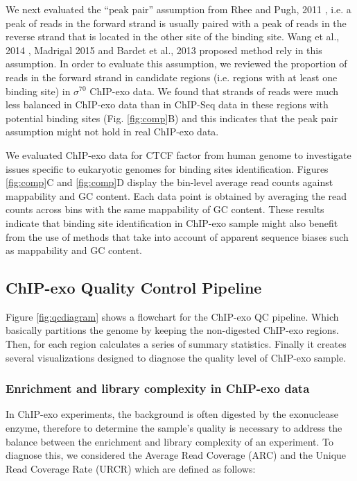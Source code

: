 \documentclass{bmcart}\usepackage[]{graphicx}\usepackage[]{color}
\newcommand{\sig}{\sigma^{70}}
\begin{document}
We next evaluated the ``peak pair'' assumption from Rhee and Pugh,
2011 \cite{exo1}, i.e. a peak of reads in the forward strand is
usually paired with a peak of reads in the reverse strand that is
located in the other site of the binding site. Wang et al., 2014
\cite{mace}, Madrigal 2015 \cite{cexor} and Bardet et al., 2013
\cite{peakzilla} proposed method rely in this assumption. In order to
evaluate this assumption, we reviewed the proportion of reads in the
forward strand in candidate regions (i.e. regions with at least one
binding site) in $\sig$ ChIP-exo data. We found that strands of reads
were much less balanced in ChIP-exo data than in ChIP-Seq data in
these regions with potential binding sites (Fig. \ref{fig:comp}B) and
this indicates that the peak pair assumption might not hold in real
ChIP-exo data.

We evaluated ChIP-exo data for CTCF factor from human genome
\cite{exo1} to investigate issues specific to eukaryotic genomes for
binding sites identification. Figures \ref{fig:comp}C and
\ref{fig:comp}D display the bin-level average read counts against
mappability and GC content. Each data point is obtained by averaging
the read counts across bins with the same mappability of GC
content. These results indicate that binding site identification in
ChIP-exo sample might also benefit from the use of methods that take
into account of apparent sequence biases such as mappability and GC
content.


\subsection{ChIP-exo Quality Control Pipeline}

Figure \ref{fig:qcdiagram} shows a flowchart for the ChIP-exo QC
pipeline. Which basically partitions the genome by keeping the
non-digested ChIP-exo regions. Then, for each region calculates a
series of summary statistics. Finally it creates several
visualizations designed to diagnose the quality level of ChIP-exo
sample.

\subsubsection{Enrichment and library complexity in ChIP-exo data}

In ChIP-exo experiments, the background is often digested by the
exonuclease enzyme, therefore to determine the sample's quality is
necessary to address the balance between the enrichment and library
complexity of an experiment. To diagnose this, we considered the
Average Read Coverage (ARC) and the Unique Read Coverage Rate (URCR)
which are defined as follows:
\end{document}
